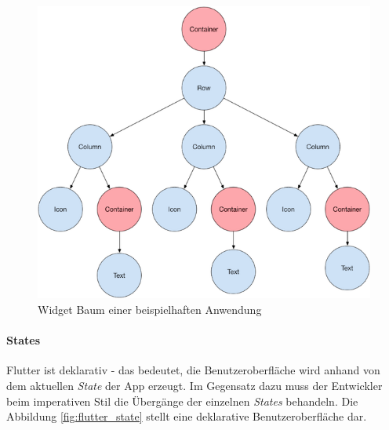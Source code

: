 \begin{figure}[tbt]
	\begin{center}
		\includegraphics[scale=0.5]{Theoretische_Grundlagen/images/flutter_widget_tree.png}
	\end{center}
	\caption[Widget Baum einer beispielhaften Anwendung]{Widget Baum einer beispielhaften Anwendung \protect \footnotemark}
	\label{fig:flutter_widget_tree}
\end{figure}
	

\paragraph{States}
Flutter ist deklarativ - das bedeutet, die Benutzeroberfläche wird anhand von dem aktuellen \textit{State} der App erzeugt. 
Im Gegensatz dazu muss der Entwickler beim imperativen Stil die Übergänge der einzelnen \textit{States} behandeln. 
Die Abbildung \ref{fig:flutter_state} stellt eine deklarative Benutzeroberfläche dar. 
	
